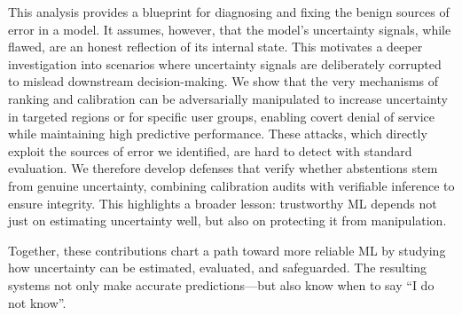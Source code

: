This analysis provides a blueprint for diagnosing and fixing the benign sources of error in a model. It assumes, however, that the model's uncertainty signals, while flawed, are an honest reflection of its internal state. This motivates a deeper investigation into scenarios where uncertainty signals are deliberately corrupted to mislead downstream decision-making. We show that the very mechanisms of ranking and calibration can be adversarially manipulated to increase uncertainty in targeted regions or for specific user groups, enabling covert denial of service while maintaining high predictive performance. These attacks, which directly exploit the sources of error we identified, are hard to detect with standard evaluation. We therefore develop defenses that verify whether abstentions stem from genuine uncertainty, combining calibration audits with verifiable inference to ensure integrity. This highlights a broader lesson: trustworthy ML depends not just on estimating uncertainty well, but also on protecting it from manipulation.

Together, these contributions chart a path toward more reliable ML by studying how uncertainty can be estimated, evaluated, and safeguarded. The resulting systems not only make accurate predictions—but also know when to say “I do not know”.
